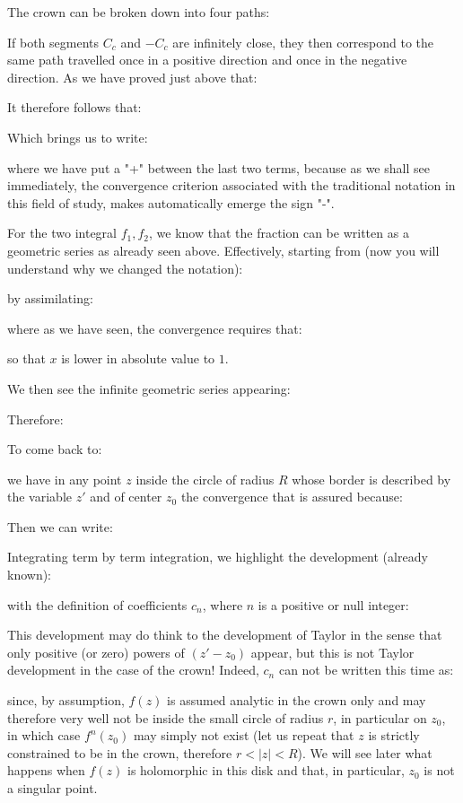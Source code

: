 	The crown can be broken down into four paths:
	
	If both segments $C_c$ and $-C_c$ are infinitely close, they then correspond to the same path travelled once in a positive direction and once in the negative direction. As we have proved just above that:
	
	It therefore follows that:
	
	Which brings us to write:
	
	where we have put a "+" between the last two terms, because as we shall see immediately, the convergence criterion associated with the traditional notation in this field of study, makes automatically emerge the sign "-".
	
	For the two integral $f_1,f_2$, we know that the fraction can be written as a geometric series as already seen above. Effectively, starting from (now you will understand why we changed the notation):
	
	by assimilating:
	
	where as we have seen, the convergence requires that:
	
	so that $x$ is lower in absolute value to $1$.
	
	We then see the infinite geometric series appearing:
	
	Therefore:
	
	To come back to:
	
	we have in any point $z$ inside the circle of radius $R$ whose border is described by the variable $z'$ and of center $z_0$ the convergence that is assured because:
	
	Then we can write:
	
	Integrating term by term integration, we highlight the development (already known):
	
	with the definition of coefficients $c_n$, where $n$ is a positive or null integer:
	
	This development may do think to the development of Taylor in the sense that only positive (or zero) powers of $(z'-z_0)$ appear, but this is not Taylor development in the case of the crown! Indeed, $c_n$ can not be written this time as:
	
	since, by assumption, $f(z)$ is assumed analytic in the crown only and may therefore very well not be inside the small circle of radius $r$, in particular on $z_0$, in which case $f^{n}(z_0)$ may simply not exist (let us repeat that $z$ is strictly constrained to be in the crown, therefore $r<\vert z \vert <R$). We will see later what happens when $f (z)$ is holomorphic in this disk and that, in particular, $z_0$ is not a singular point.
	
